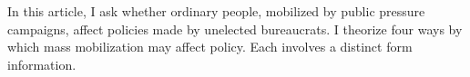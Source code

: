 In this article, I ask whether ordinary people, mobilized by public pressure campaigns, affect policies made by unelected bureaucrats. 
I theorize four ways by which mass mobilization may affect policy. Each involves a distinct form information. 


